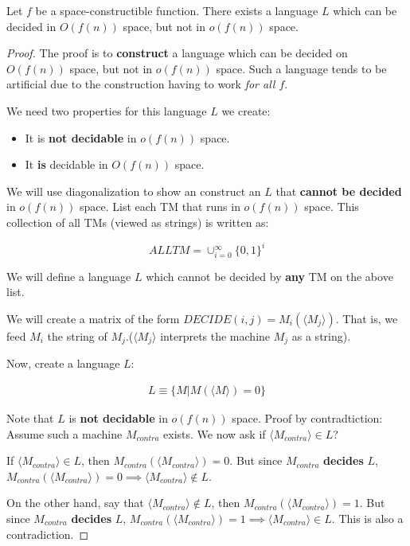 \begin{theorem}
Let $f$ be a space-constructible function. There exists a language $L$ which
can be decided in $O(f(n))$ space, but not in $o(f(n))$ space.
\end{theorem}
\begin{proof}
The proof is to \textbf{construct} a language which can be decided on $O(f(n))$
space, but not in $o(f(n))$ space. Such a language tends to be artificial due
to the construction having to work \textit{for all $f$}.

We need two properties for this language $L$ we create:

\begin{itemize}
\item It is \textbf{not decidable} in $o(f(n))$ space.
\item It \textbf{is} decidable in $O(f(n))$ space.
\end{itemize}

We will use diagonalization to show an construct an $L$ that 
\textbf{cannot be decided} in $o(f(n))$ space. List each TM that runs in 
$o(f(n))$ space. This collection of all TMs (viewed as strings) is written as:

$$ALLTM = \cup_{i=0}^\infty \{0, 1\}^i$$


We will define a language $L$ which cannot be decided by \textbf{any} TM
on the above list.

We will create a matrix of the form $DECIDE(i, j) = M_i(\langle M_j \rangle)$.
That is, we feed $M_i$ the string of $M_j$.($\langle M_j \rangle$ interprets
the machine $M_j$ as a string).

Now, create a language $L$:

\begin{align*}
L \equiv \{ M \vert M ( \langle M \rangle ) = 0 \}
\end{align*}

Note that $L$ is \textbf{not decidable} in $o(f(n))$ space. Proof by contradtiction:
Assume such a machine $M_{contra}$ exists. We now ask if $\langle M_{contra} \rangle \in L$?

If $\langle M_{contra} \rangle \in L$, then $M_{contra} (\langle M_{contra} \rangle) = 0$.
But since $M_{contra}$ \textbf{decides} $L$,
$M_{contra} (\langle M_{contra} \rangle) = 0 \implies  \langle M_{contra} \rangle \notin L$.

On the other hand, say that $\langle M_{contra} \rangle \notin L$, then $M_{contra} (\langle M_{contra} \rangle) = 1$.
But since $M_{contra}$ \textbf{decides} $L$, $M_{contra} (\langle M_{contra} \rangle) = 1 \implies \langle M_{contra} \rangle \in L$. This is also a contradiction.



\end{proof}
